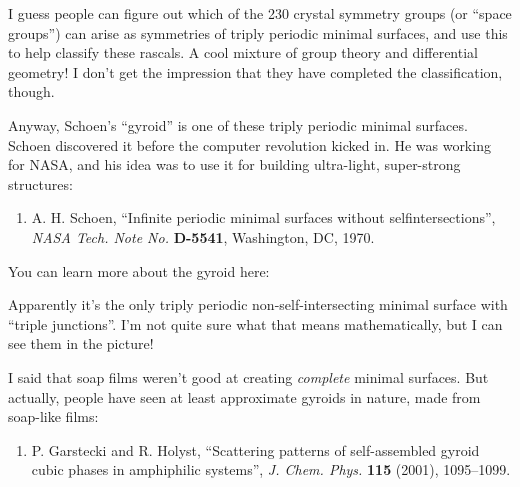 \documentclass{article}
\def\tightlist{}
\renewcommand{\texttt}[1]{%
  \begingroup
  \ttfamily
  \begingroup\lccode`~=`/\lowercase{\endgroup\def~}{/\discretionary{}{}{}}%
  \begingroup\lccode`~=`[\lowercase{\endgroup\def~}{[\discretionary{}{}{}}%
  \begingroup\lccode`~=`.\lowercase{\endgroup\def~}{.\discretionary{}{}{}}%
  \catcode`/=\active\catcode`[=\active\catcode`.=\active
  \scantokens{#1\noexpand}%
  \endgroup
}
\begin{document}

I guess people can figure out which of the 230 crystal symmetry groups
(or ``space groups'') can arise as symmetries of triply periodic minimal
surfaces, and use this to help classify these rascals. A cool mixture of
group theory and differential geometry! I don't get the impression that
they have completed the classification, though.

Anyway, Schoen's ``gyroid'' is one of these triply periodic minimal
surfaces. Schoen discovered it before the computer revolution kicked in.
He was working for NASA, and his idea was to use it for building
ultra-light, super-strong structures:

\begin{enumerate}
\def\labelenumi{\arabic{enumi})}
\setcounter{enumi}{12}
\tightlist
\item
  A. H. Schoen, ``Infinite periodic minimal surfaces without
  selfintersections'', \emph{NASA Tech. Note No.} \textbf{D-5541},
  Washington, DC, 1970.
\end{enumerate}

You can learn more about the gyroid here:


Apparently it's the only triply periodic non-self-intersecting minimal
surface with ``triple junctions''. I'm not quite sure what that means
mathematically, but I can see them in the picture!

I said that soap films weren't good at creating \emph{complete} minimal
surfaces. But actually, people have seen at least approximate gyroids in
nature, made from soap-like films:

\begin{enumerate}
\def\labelenumi{\arabic{enumi})}
\setcounter{enumi}{14}
\tightlist
\item
  P. Garstecki and R. Holyst, ``Scattering patterns of self-assembled
  gyroid cubic phases in amphiphilic systems'', \emph{J. Chem. Phys.}
  \textbf{115} (2001), 1095--1099.
\end{enumerate}
\end{document}
